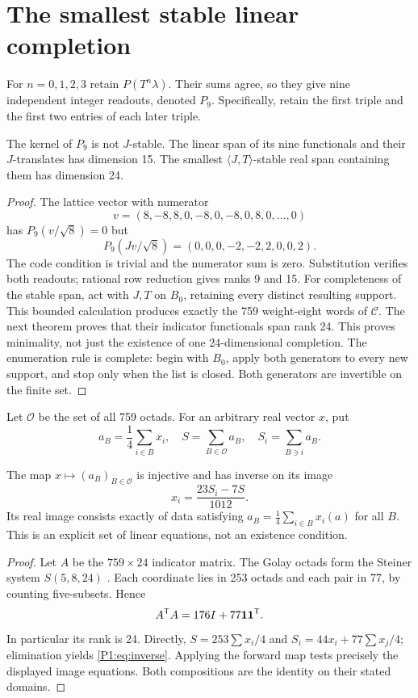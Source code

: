 \section{The smallest stable linear completion}
For $n=0,1,2,3$ retain $P(T^n\lambda)$. Their sums agree, so they give nine independent integer readouts, denoted $P_9$. Specifically, retain the first triple and the first two entries of each later triple.
\begin{proposition}\label{P1:prop:ninefailure}
The kernel of $P_9$ is not $J$-stable. The linear span of its nine functionals and their $J$-translates has dimension 15. The smallest $\langle J,T\rangle$-stable real span containing them has dimension 24.
\end{proposition}
\begin{proof}
The lattice vector with numerator
\[
v=(8,-8,8,0,-8,0,-8,0,8,0,\ldots,0)
\]
has $P_9(v/\sqrt8)=0$ but
\[
P_9(Jv/\sqrt8)=(0,0,0,-2,-2,2,0,0,2).
\]
The code condition is trivial and the numerator sum is zero. Substitution verifies both readouts; rational row reduction gives ranks 9 and 15. For completeness of the stable span, act with $J,T$ on $B_0$, retaining every distinct resulting support. This bounded calculation produces exactly the 759 weight-eight words of $\mathcal C$. The next theorem proves that their indicator functionals span rank 24. This proves minimality, not just the existence of one 24-dimensional completion. The enumeration rule is complete: begin with $B_0$, apply both generators to every new support, and stop only when the list is closed. Both generators are invertible on the finite set.
\end{proof}

Let $\mathcal O$ be the set of all 759 octads. For an arbitrary real vector $x$, put
\[
 a_B=\frac14\sum_{i\in B}x_i,\quad
 S=\sum_{B\in\mathcal O}a_B,\quad
 S_i=\sum_{B\ni i}a_B.
\]
\begin{theorem}\label{P1:thm:reconstruction}
The map $x\mapsto(a_B)_{B\in\mathcal O}$ is injective and has inverse on its image
\begin{equation}\label{P1:eq:inverse}
\boxed{x_i=\frac{23S_i-7S}{1012}.}
\end{equation}
Its real image consists exactly of data satisfying
$a_B=\frac14\sum_{i\in B}x_i(a)$ for all $B$. This is an explicit set of linear equations, not an existence condition.
\end{theorem}
\begin{proof}
Let $A$ be the $759\times24$ indicator matrix. The Golay octads form the Steiner system $S(5,8,24)$ \cite[Theorem 1]{chapman}. Each coordinate lies in 253 octads and each pair in 77, by counting five-subsets. Hence
\[
A^{\mathsf T}A=176I+77\mathbf1\mathbf1^{\mathsf T}.
\]
In particular its rank is 24. Directly,
$S=253\sum x_i/4$ and $S_i=44x_i+77\sum x_j/4$; elimination yields \eqref{P1:eq:inverse}. Applying the forward map tests precisely the displayed image equations. Both compositions are the identity on their stated domains.
\end{proof}

